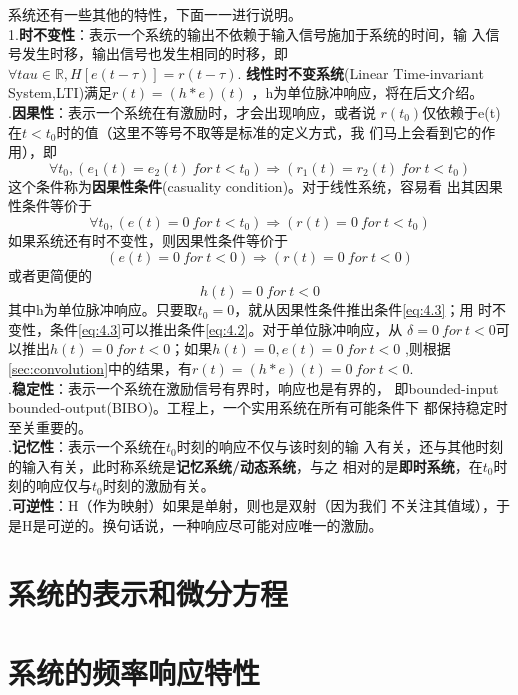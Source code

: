 \documentclass{ctexbook}
\begin{document}
系统还有一些其他的特性，下面一一进行说明。\\
1.\textbf{时不变性}：表示一个系统的输出不依赖于输入信号施加于系统的时间，输
入信号发生时移，输出信号也发生相同的时移，即$\forall tau\in\mathbb{R},H[e(t-\tau)]=r(t-\tau)$.
\textbf{线性时不变系统}(Linear Time-invariant System,LTI)满足$r(t)=(h*e)(t)$
，h为单位脉冲响应，将在后文介绍。
\\
.\textbf{因果性}：表示一个系统在有激励时，才会出现响应，或者说
$r(t_0)$仅依赖于e(t)在$t<t_0$时的值（这里不等号不取等是标准的定义方式，我
们马上会看到它的作用），即
\begin{equation}
    \forall t_0,(e_1(t)=e_2(t)\ for\ t<t_0)\Rightarrow (r_1(t)=r_2(t)\ for\ t<t_0)\label{eq:4.1}
\end{equation}
这个条件称为\textbf{因果性条件}(casuality condition)。对于线性系统，容易看
出其因果性条件等价于
\begin{equation}
    \forall t_0,(e(t)=0\ for\ t<t_0)\Rightarrow (r(t)=0\ for\ t<t_0)\label{eq:4.2}
\end{equation}
如果系统还有时不变性，则因果性条件等价于
\begin{equation}
    (e(t)=0\ for\ t<0)\Rightarrow(r(t)=0\ for\ t<0)\label{eq:4.3}
\end{equation}
或者更简便的
\begin{equation}
    h(t)=0\ for\ t<0\label{eq:4.4}
\end{equation}
其中h为单位脉冲响应。只要取$t_0=0$，就从因果性条件推出条件\ref{eq:4.3}；用
时不变性，条件\ref{eq:4.3}可以推出条件\ref{eq:4.2}。对于单位脉冲响应，从
$\delta=0\ for\ t<0$可以推出$h(t)=0\ for\ t<0$；如果$h(t)=0,e(t)=0\ for\ t<0$
,则根据\ref{sec:convolution}中的结果，有$r(t)=(h*e)(t)=0\ for\ t<0$.\\

.\textbf{稳定性}：表示一个系统在激励信号有界时，响应也是有界的，
即bounded-input bounded-output(BIBO)。工程上，一个实用系统在所有可能条件下
都保持稳定时至关重要的。\\

.\textbf{记忆性}：表示一个系统在$t_0$时刻的响应不仅与该时刻的输
入有关，还与其他时刻的输入有关，此时称系统是\textbf{记忆系统/动态系统}，与之
相对的是\textbf{即时系统}，在$t_0$时刻的响应仅与$t_0$时刻的激励有关。\\

.\textbf{可逆性}：H（作为映射）如果是单射，则也是双射（因为我们
不关注其值域），于是H是可逆的。换句话说，一种响应尽可能对应唯一的激励。


\section{系统的表示和微分方程}\label{sec:Presentation_ODE}


\section{系统的频率响应特性}\label{sec:freq_response}
\end{document}
